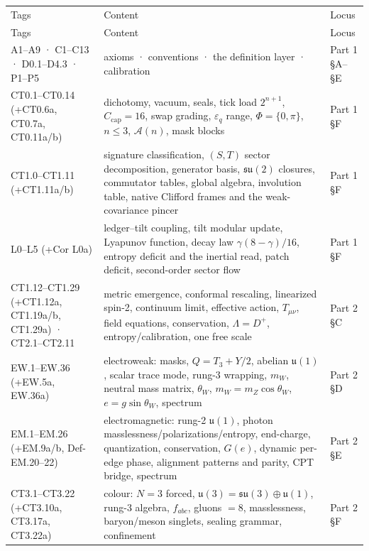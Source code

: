{\scriptsize\setlength{\tabcolsep}{4pt}
\begin{longtable}{>{\raggedright\arraybackslash}p{}|>{\raggedright\arraybackslash}p{}|>{\raggedright\arraybackslash}p{}}
\toprule
Tags & Content & Locus \\
\addlinespace[2pt]
\midrule
\endfirsthead
\toprule
Tags & Content & Locus \\
\addlinespace[2pt]
\midrule
\endhead
\bottomrule
\endlastfoot
A1–A9 · C1–C13 · D0.1–D4.3 · P1–P5 & axioms · conventions · the definition layer · calibration & Part 1 §A–§E \\
CT0.1–CT0.14 (+CT0.6a, CT0.7a, CT0.11a/b) & dichotomy, vacuum, seals, tick load $2^{n+1}$, $C_{\mathrm{cap}}=\allowbreak 16$, swap grading, $\varepsilon_q$ range, $\Phi=\allowbreak \{0,\pi\}$, $n\le\allowbreak 3$, $\mathcal A(n)$, mask blocks & Part 1 §F \\
CT1.0–CT1.11 (+CT1.11a/b) & signature classification, $(S,\allowbreak T)$ sector decomposition, generator basis, $\mathfrak{su}(2)$ closures, commutator tables, global algebra, involution table, native Clifford frames and the weak-covariance pincer & Part 1 §F \\
L0–L5 (+Cor L0a) & ledger–tilt coupling, tilt modular update, Lyapunov function, decay law $\gamma(8-\gamma)/16$, entropy deficit and the inertial read, patch deficit, second-order sector flow & Part 1 §F \\
CT1.12–CT1.29 (+CT1.12a, CT1.19a/b, CT1.29a) · CT2.1–CT2.11 & metric emergence, conformal rescaling, linearized spin-2, continuum limit, effective action, $T_{\mu\nu}$, field equations, conservation, $\Lambda=\allowbreak D^+$, entropy/calibration, one free scale & Part 2 §C \\
EW.1–EW.36 (+EW.5a, EW.36a) & electroweak: masks, $Q=\allowbreak T_3+\allowbreak Y/2$, abelian $\mathfrak u(1)$, scalar trace mode, rung-3 wrapping, $m_W$, neutral mass matrix, $\theta_W$, $m_W=\allowbreak m_Z\cos\theta_W$, $e=\allowbreak g\sin\theta_W$, spectrum & Part 2 §D \\
EM.1–EM.26 (+EM.9a/b, Def-EM.20–22) & electromagnetic: rung-2 $\mathfrak u(1)$, photon masslessness/polarizations/entropy, end-charge, quantization, conservation, $G(e)$, dynamic per-edge phase, alignment patterns and parity, CPT bridge, spectrum & Part 2 §E \\
CT3.1–CT3.22 (+CT3.10a, CT3.17a, CT3.22a) & colour: $N=\allowbreak 3$ forced, $\mathfrak u(3)=\allowbreak \mathfrak{su}(3)\oplus\mathfrak u(1)$, rung-3 algebra, $f_{abc}$, gluons $=\allowbreak 8$, masslessness, baryon/meson singlets, sealing grammar, confinement & Part 2 §F \\

\end{longtable}}
